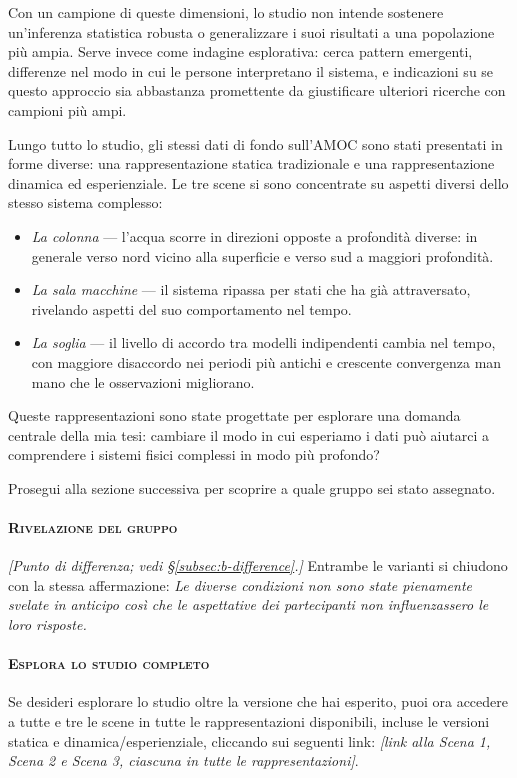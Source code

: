 Con un campione di queste dimensioni, lo studio non intende sostenere un'inferenza statistica robusta
o generalizzare i suoi risultati a una popolazione più ampia. Serve invece come indagine
esplorativa: cerca pattern emergenti, differenze nel modo in cui le persone interpretano il sistema,
e indicazioni su se questo approccio sia abbastanza promettente da giustificare ulteriori ricerche
con campioni più ampi.

Lungo tutto lo studio, gli stessi dati di fondo sull'AMOC sono stati presentati in forme diverse:
una rappresentazione statica tradizionale e una rappresentazione dinamica ed esperienziale. Le tre
scene si sono concentrate su aspetti diversi dello stesso sistema complesso:

\begin{itemize}[leftmargin=2em, itemsep=2pt]
\item \emph{La colonna} --- l'acqua scorre in direzioni opposte a profondità diverse: in generale
      verso nord vicino alla superficie e verso sud a maggiori profondità.
\item \emph{La sala macchine} --- il sistema ripassa per stati che ha già attraversato, rivelando
      aspetti del suo comportamento nel tempo.
\item \emph{La soglia} --- il livello di accordo tra modelli indipendenti cambia nel tempo, con
      maggiore disaccordo nei periodi più antichi e crescente convergenza man mano che le
      osservazioni migliorano.
\end{itemize}

Queste rappresentazioni sono state progettate per esplorare una domanda centrale della mia tesi:
cambiare il modo in cui esperiamo i dati può aiutarci a comprendere i sistemi fisici complessi in
modo più profondo?

Prosegui alla sezione successiva per scoprire a quale gruppo sei stato assegnato.

\paragraph{\textsc{Rivelazione del gruppo}}
\emph{[Punto di differenza; vedi \S\ref{subsec:b-difference}.]} Entrambe le varianti si chiudono con
la stessa affermazione: \emph{Le diverse condizioni non sono state pienamente svelate in anticipo
così che le aspettative dei partecipanti non influenzassero le loro risposte.}

\paragraph{\textsc{Esplora lo studio completo}}
Se desideri esplorare lo studio oltre la versione che hai esperito, puoi ora accedere a tutte e tre
le scene in tutte le rappresentazioni disponibili, incluse le versioni statica e
dinamica/esperienziale, cliccando sui seguenti link: \emph{[link alla Scena 1, Scena 2 e Scena 3,
ciascuna in tutte le rappresentazioni]}.

